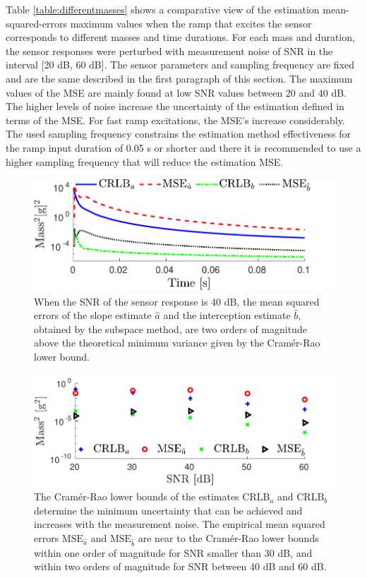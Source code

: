 Table \ref{table:differentmasses} shows a comparative view of the estimation mean-squared-errors maximum values when the ramp that excites the sensor corresponds to different masses and time durations. 
For each mass and duration, the sensor responses were perturbed with measurement noise of SNR in the interval [20 dB, 60 dB].
The sensor parameters and sampling frequency are fixed and are the same described in the first paragraph of this section.
The maximum values of the MSE are mainly found at low SNR values between 20 and 40 dB.
The higher levels of noise increase the uncertainty of the estimation defined in terms of the MSE.
For fast ramp excitations, the MSE's increase considerably.
The used sampling frequency constrains the estimation method effectiveness for the ramp input duration of 0.05 s or shorter and there it is recommended to use  a higher sampling frequency that will reduce the estimation MSE.


\begin{figure}[!htbp]
\centering
\includegraphics[width=\columnwidth]{./ChapterRampInput/fig/Fig_5.pdf} 
\caption{ \label{fig:CRLB_MSE_ab_dd_40dB_MC_10000} When the SNR of the sensor response is 40 dB, the mean squared errors of the slope estimate $\widehat{a}$ and the interception estimate $\widehat{b}$, obtained by the subspace method, are two orders of magnitude above the theoretical minimum variance given by the Cram\'er-Rao lower bound.}
\end{figure}


\begin{figure}[!htbp]
\centering
\includegraphics[width=\columnwidth]{./ChapterRampInput/fig/Fig_6.pdf} 
\caption{ \label{fig:CRLB_MSE_SNR_ab_dd_MC_10000} The Cram\'er-Rao lower bounds of the estimates $\mathrm{CRLB}_a$ and $\mathrm{CRLB}_b$ determine the minimum uncertainty that can be achieved and increases with the measurement noise. 
The empirical mean squared errors $\mathrm{MSE}_{\hat{a}}$ and $\mathrm{MSE}_{\hat{b}}$ are near to the Cram\'er-Rao lower bounds within one order of magnitude for SNR smaller than 30 dB, and within two orders of magnitude for SNR between 40 dB and 60 dB. }
\end{figure}




